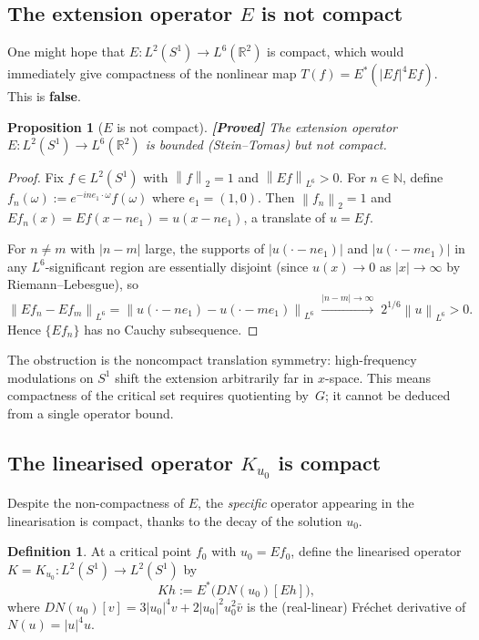 \documentclass[12pt]{article}
\newtheorem{proposition}[theorem]{Proposition}
\theoremstyle{definition}
\newtheorem{definition}[theorem]{Definition}
\theoremstyle{remark}
\newcommand{\R}{\mathbb{R}}
\newcommand{\N}{\mathbb{N}}
\newcommand{\norm}[1]{\left\|#1\right\|}
\newcommand{\proven}{\textbf{\color{teal}[Proved]}}
\begin{document}
\subsection{The extension operator $E$ is not compact}

One might hope that $E:L^2(S^1)\to L^6(\R^2)$ is compact, which would
immediately give compactness of the nonlinear map $T(f)=E^*(|Ef|^4Ef)$.
This is \textbf{false}.

\begin{proposition}[$E$ is not compact]
  \label{prop:E-not-compact}
  \proven\quad
  The extension operator $E:L^2(S^1)\to L^6(\R^2)$ is bounded
  (Stein--Tomas) but not compact.
\end{proposition}

\begin{proof}
  Fix $f\in L^2(S^1)$ with $\norm{f}_2=1$ and $\norm{Ef}_{L^6}>0$.
  For $n\in\N$, define $f_n(\omega):=e^{-ine_1\cdot\omega}f(\omega)$
  where $e_1=(1,0)$.  Then $\norm{f_n}_2=1$ and
  $Ef_n(x)=Ef(x-ne_1)=u(x-ne_1)$, a translate of $u=Ef$.

  For $n\neq m$ with $|n-m|$ large, the supports of $|u(\cdot-ne_1)|$ and
  $|u(\cdot-me_1)|$ in any $L^6$-significant region are essentially disjoint
  (since $u(x)\to 0$ as $|x|\to\infty$ by Riemann--Lebesgue), so
  \[
    \norm{Ef_n-Ef_m}_{L^6}
    = \norm{u(\cdot-ne_1)-u(\cdot-me_1)}_{L^6}
    \;\xrightarrow{|n-m|\to\infty}\;
    2^{1/6}\norm{u}_{L^6}>0.
  \]
  Hence $\{Ef_n\}$ has no Cauchy subsequence.
\end{proof}

The obstruction is the noncompact translation symmetry: high-frequency
modulations on $S^1$ shift the extension arbitrarily far in $x$-space.
This means compactness of the critical set requires quotienting by~$G$;
it cannot be deduced from a single operator bound.

\subsection{The linearised operator $K_{u_0}$ is compact}

Despite the non-compactness of $E$, the \emph{specific} operator appearing
in the linearisation is compact, thanks to the decay of the solution $u_0$.

\begin{definition}
  At a critical point $f_0$ with $u_0=Ef_0$, define the linearised operator
  $K=K_{u_0}:L^2(S^1)\to L^2(S^1)$ by
  \[
    Kh := E^*\bigl(DN(u_0)[Eh]\bigr),
  \]
  where $DN(u_0)[v]=3|u_0|^4v+2|u_0|^2u_0^2\bar v$ is the (real-linear)
  Fr\'echet derivative of $N(u)=|u|^4u$.
\end{definition}
\end{document}
